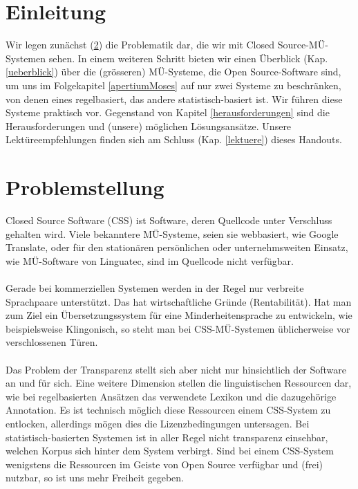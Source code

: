\documentclass[11pt,twoside]{mparticle}
\begin{document}
\section{Einleitung}
\label{einleitung}
Wir legen zunächst (\ref{problemstellung}) die Problematik dar, die wir mit Closed Source-MÜ-Systemen sehen. 
In einem weiteren Schritt bieten wir einen Überblick (Kap. \ref{ueberblick}) über die (grösseren) MÜ-Systeme,
die Open Source-Software sind, um uns im Folgekapitel \ref{apertiumMoses} auf nur zwei Systeme zu beschränken, 
von denen eines regelbasiert, das andere statistisch-basiert ist. Wir führen diese Systeme praktisch vor. Gegenstand von
Kapitel \ref{herausforderungen} sind die Herausforderungen und (unsere) möglichen Lösungsansätze.
Unsere Lektüreempfehlungen finden sich am Schluss (Kap. \ref{lektuere}) dieses Handouts.

\section{Problemstellung}
\label{problemstellung}
Closed Source Software (CSS) ist Software, deren Quellcode unter Verschluss gehalten wird. Viele bekanntere MÜ-Systeme,
seien sie webbasiert, wie Google Translate, oder für den stationären persönlichen oder unternehmsweiten Einsatz, 
wie MÜ-Software von Linguatec, sind im Quellcode nicht verfügbar. 
\\
\\
Gerade bei kommerziellen Systemen werden in der Regel nur verbreite Sprachpaare unterstützt. Das hat wirtschaftliche
Gründe (Rentabilität). Hat man zum Ziel ein Übersetzungssystem für eine Minderheitensprache zu entwickeln, wie beispielsweise 
Klingonisch, so steht man bei CSS-MÜ-Systemen üblicherweise vor verschlossenen Türen.
\\
\\
Das Problem der Transparenz stellt sich aber nicht nur hinsichtlich der Software an und für sich. Eine weitere Dimension
stellen die linguistischen Ressourcen dar, wie bei regelbasierten Ansätzen das verwendete Lexikon und die dazugehörige 
Annotation. Es ist technisch möglich diese Ressourcen einem CSS-System zu entlocken, allerdings mögen dies die
Lizenzbedingungen untersagen. Bei statistisch-basierten Systemen ist in aller Regel nicht transparenz einsehbar,
welchen Korpus sich hinter dem System verbirgt. Sind bei einem CSS-System wenigstens die Ressourcen im Geiste von
Open Source verfügbar und (frei) nutzbar, so ist uns mehr Freiheit gegeben.
\end{document}
